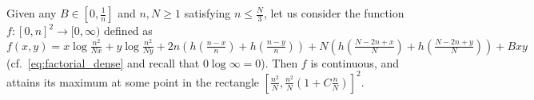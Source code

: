 \documentclass[11pt,reqno,letterpaper]{amsart}
\numberwithin{equation}{section}
\theoremstyle{plain}
\begin{document}
\vspace{0.3cm}

 Given any $B \in [0, \frac1n]$ and $n, N \ge 1$ satisfying $n \le \frac N{3}$, let us consider the function $f: [0, n]^2 \to [0, \infty)$ defined as 
\begin{equation*}
f(x, y) = x\log\tfrac{n^2}{Nx} + y\log\tfrac{n^2}{Ny} + 2n(h(\tfrac{n - x}n) + h(\tfrac{n - y}n)) + N (h(\tfrac{N - 2n + x}N) + h(\tfrac{N - 2n + y}N)) + Bxy
\end{equation*}
(cf.~\eqref{eq:factorial_dense} and recall that $0\log \infty = 0$). Then $f$ is continuous, and attains its maximum 
at some point in the rectangle $[\frac {n^2}N, \frac {n^2}N(1 + C \frac n N)]^2$.

\vspace{0.2cm}
\end{document}
